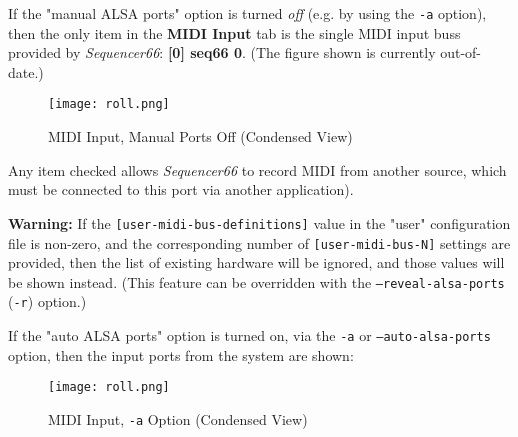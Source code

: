    If the "manual ALSA ports" option is turned \textsl{off} (e.g. by using the
   \texttt{-a} option),
   then the only item in the \textbf{MIDI Input} tab is the single MIDI input
   buss provided by \textsl{Sequencer66}:  \textbf{[0] seq66 0}.
   (The figure shown is currently out-of-date.)


\begin{figure}[H]
   \centering 
   \texttt{[image: roll.png]}
   \caption{MIDI Input, Manual Ports Off (Condensed View)}
   \label{fig:seq66_midi_input_4_devices_manual_1}
\end{figure}



   Any item checked allows \textsl{Sequencer66} to record MIDI
   from another source,
   which must be connected to this port via
   another application).

   \textbf{Warning:}
   If the 
   \texttt{[user-midi-bus-definitions]} value in the "user" configuration file
   is non-zero, and the
   corresponding number of
   \texttt{[user-midi-bus-N]} settings are provided, then
   the list of existing hardware will be ignored, and those values will be
   shown instead.
   (This feature can be overridden with the
   \texttt{--reveal-alsa-ports} (\texttt{-r}) option.)


   If the "auto ALSA ports" option is turned on, via the \texttt{-a} or
   \texttt{--auto-alsa-ports} option, then
   the input ports from the system are shown:

\begin{figure}[H]
   \centering 
   \texttt{[image: roll.png]}
   \caption{MIDI Input, \texttt{-a} Option (Condensed View)}
   \label{fig:seq66_midi_input_4_devices_manual_0}
\end{figure}

